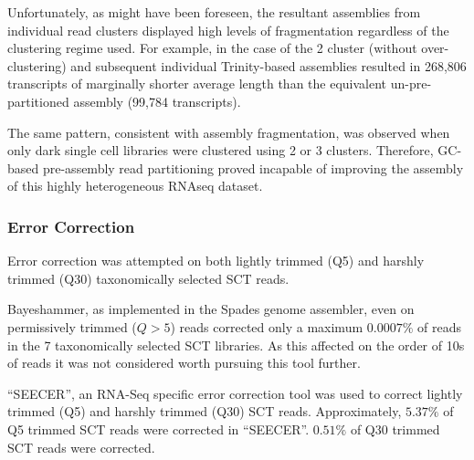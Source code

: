 Unfortunately, as might have been foreseen, the resultant assemblies from individual
read clusters displayed high levels of fragmentation regardless of the clustering
regime used.  For example, in the case of the 2 cluster (without over-clustering) 
and subsequent individual Trinity-based assemblies resulted in 268,806 transcripts
of marginally shorter average length than the equivalent un-pre-partitioned assembly
(99,784 transcripts).

The same pattern, consistent with assembly fragmentation, 
was observed when only dark single cell libraries were clustered using 
2 or 3 clusters. 
Therefore, GC-based pre-assembly read partitioning proved incapable of improving
the assembly of this highly heterogeneous RNAseq dataset.


\subsubsection{Error Correction}

Error correction was attempted on both lightly trimmed (Q5) and harshly trimmed (Q30) 
taxonomically selected SCT reads.

Bayeshammer, as implemented in the Spades genome assembler, even on permissively trimmed
(\(Q>5\)) reads corrected only a maximum \(0.0007\%\) of reads in the 7 taxonomically selected SCT libraries.
As this affected on the order of 10s of reads it was not considered worth pursuing this tool further.

``SEECER'', an RNA-Seq specific error correction tool was used to correct 
lightly trimmed (Q5) and harshly trimmed (Q30) SCT reads.  
Approximately, \(5.37\%\) of Q5 trimmed SCT reads
were corrected in ``SEECER''. \(0.51\%\) of Q30 trimmed
SCT reads were corrected.  

